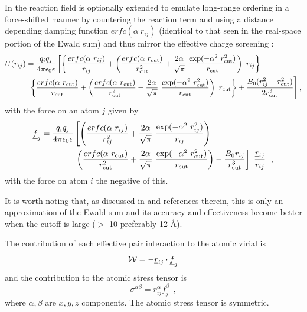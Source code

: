In \D the reaction field is optionally extended to emulate
long-range ordering in a force-shifted manner by countering
the reaction term and using a distance depending damping
function $erfc(\alpha~r_{ij})$ (identical to that seen in
the real-space portion of the Ewald sum) and thus mirror the
effective charge screening \cite{fennell-06a}:
\begin{eqnarray}
U(r_{ij}) = {q_{i} q_{j} \over 4\pi\epsilon_{0}\epsilon} \left[
\left\{ \frac{erfc(\alpha~r_{ij})}{r_{ij}} + \left(\frac{erfc(\alpha~r_{\rm cut})}{r_{\rm cut}^{2}}+
\frac{2\alpha}{\sqrt{\pi}}~\frac{\exp(-\alpha^{2}~r_{\rm cut}^{2})}{r_{\rm cut}}\right)~r_{ij}\right\} - \phantom{xxxxxxx} \right. \nonumber \\
\left. \left\{ \frac{erfc(\alpha~r_{\rm cut})}{r_{\rm cut}} + \left(\frac{erfc(\alpha~r_{\rm cut})}{r_{\rm cut}^{2}}+
\frac{2\alpha}{\sqrt{\pi}}~\frac{\exp(-\alpha^{2}~r_{\rm cut}^{2})}{r_{\rm cut}}\right)~r_{\rm cut}\right\} +
\frac{B_{0}(r_{ij}^{2}-r_{\rm cut}^{2})}{2 r_{\rm cut}^{3}} \right],
\end{eqnarray}
with the force on an atom $j$ given by
\begin{eqnarray}
\mbox{$\underline{f}$}_{j} = {q_{i} q_{j} \over 4\pi\epsilon_{0}\epsilon} \left[ \left( \frac{erfc(\alpha~r_{ij})}{r_{ij}^{2}} +
\frac{2\alpha}{\sqrt{\pi}}~\frac{\exp(-\alpha^{2}~r_{ij}^{2})}{r_{ij}} \right) - \phantom{xxxxxxxxxxx} \right. \nonumber \\
\left. \left( \frac{erfc(\alpha~r_{\rm cut})}{r_{\rm cut}^{2}} +
\frac{2\alpha}{\sqrt{\pi}}~\frac{\exp(-\alpha^{2}~r_{\rm cut}^{2})}{r_{\rm cut}} \right) -
\frac{B_{0}r_{ij}}{r_{\rm cut}^{3}} \right]~\frac{\mbox{$\underline{r}$}_{ij}}{r_{ij}}~~,
\end{eqnarray}
with the force on atom $i$ the negative of this.

It is worth noting that, as discussed in \cite{fennell-06a} and
references therein, this is only an approximation of the Ewald
sum and its accuracy and effectiveness become better when the
cutoff is large ($>$ 10 preferably 12 \AA).

The contribution of each effective pair interaction to the atomic
virial is
\begin{equation}
{\cal W} = -\mbox{$\underline{r}$}_{ij} \cdot \mbox{$\underline{f}$}_{j}
\end{equation}
and the contribution to the atomic stress tensor is
\begin{equation}
\sigma^{\alpha \beta} = r_{ij}^{\alpha} f_{j}^{\beta}~~,
\end{equation}
where $\alpha,\beta$ are $x,y,z$ components.  The atomic stress
tensor is symmetric.


